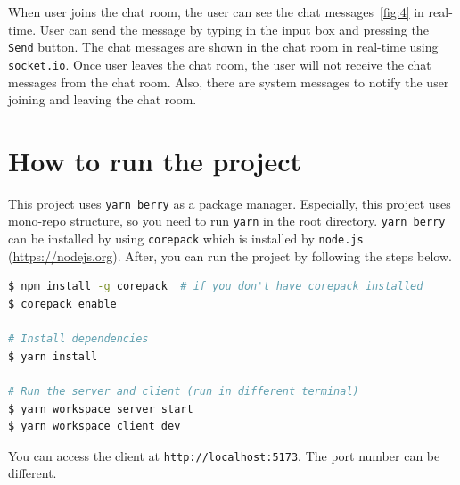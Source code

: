 \documentclass[11pt]{article}
\begin{document}
When user joins the chat room, the user can see the chat messages~\ref{fig:4} in real-time.
User can send the message by typing in the input box and pressing the \texttt{Send} button.
The chat messages are shown in the chat room in real-time using \texttt{socket.io}.
Once user leaves the chat room, the user will not receive the chat messages from the chat room.
Also, there are system messages to notify the user joining and leaving the chat room.


\section{How to run the project}

This project uses \texttt{yarn berry} as a package manager.
Especially, this project uses mono-repo structure, so you need to run \texttt{yarn} in the root directory.
\texttt{yarn berry} can be installed by using \texttt{corepack} which is installed by \texttt{node.js} (\url{https://nodejs.org}).
After, you can run the project by following the steps below.

\begin{lstlisting}[language=bash]
$ npm install -g corepack  # if you don't have corepack installed
$ corepack enable

# Install dependencies
$ yarn install

# Run the server and client (run in different terminal)
$ yarn workspace server start
$ yarn workspace client dev
\end{lstlisting}

You can access the client at \texttt{http://localhost:5173}. The port number can be different.
\end{document}
